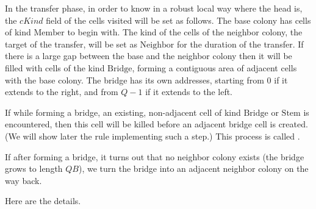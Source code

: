 \documentclass[12pt]{memoir}
\newcommand{\fld}[1]{\ensuremath{\textit{#1}}}
\renewcommand{\B}{B}
\newcommand{\cKind}{\fld{cKind}}
\newcommand{\Bridge}{\mathrm{Bridge}}
\newcommand{\Member}{\mathrm{Member}}
\newcommand{\Neighbor}{\mathrm{Neighbor}}
\newcommand{\Stem}{\mathrm{Stem}}
\begin{document}
In the transfer phase, in order to know in a robust local way where the head is,
the \( \cKind \) field of the cells visited will be set as follows.
The base colony has cells of kind \( \Member \) to begin with.
The kind of the cells of the neighbor colony, the target of the transfer, will be set
as \( \Neighbor \) for the duration of the transfer.
If there is a large gap between the base and the neighbor colony then it will be
filled with cells of the kind \( \Bridge \), forming a contiguous area of adjacent cells
with the base colony.
The bridge has its own addresses, starting from 0 if it extends to the right,
and from \( Q-1 \) if it extends to the left.

If while forming a bridge, an existing, non-adjacent 
cell of kind \( \Bridge \) or \( \Stem \)
is encountered, then this cell will be killed before an adjacent bridge cell is created.
(We will show later the rule implementing such a step.) %
This process is called .

If after forming a bridge,
it turns out that no neighbor colony exists (the bridge grows to length \( Q\B \)), 
we turn the bridge into an adjacent neighbor colony on the way back.

    Here are the details.
\end{document}
